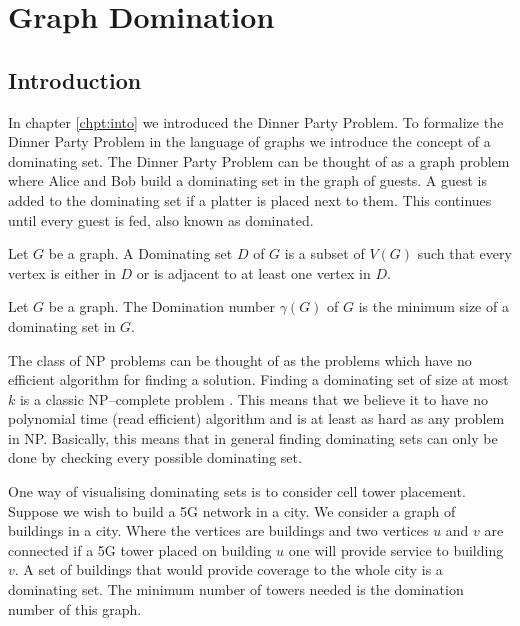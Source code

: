 \chapter{Graph Domination}\label{chpt:domSet}

\section{Introduction}

In chapter \ref{chpt:into} we introduced the Dinner Party Problem. To formalize the Dinner Party Problem in the language of graphs we introduce the concept of a dominating set. The Dinner Party Problem  can be thought of as  a graph problem where Alice and Bob build a dominating set in the graph of guests. A guest is added to the dominating set if a platter is placed next to them. This continues until every guest is fed, also known as dominated. 

\begin{definition}
    Let $G$ be a graph. A Dominating set $D$ of $G$ is a subset of $V(G)$ such that every vertex is either in $D$ or is adjacent to at least one vertex in $D$.
\end{definition} 
\begin{definition}
    Let $G$ be a graph. The Domination number $\gamma(G)$ of $G$ is the minimum size of a dominating set in $G$.
\end{definition}

The class of NP problems can be thought of as the problems which have no efficient algorithm for finding a solution. 
Finding a dominating set of size at most $k$ is a classic NP--complete problem \cite[p.~190]{garey1979computers}. This means that we believe it to have no polynomial time (read efficient) algorithm and is at least as hard as any problem in NP. Basically, this means that in general finding dominating sets can only be done by checking every possible dominating set.

One way of visualising dominating sets is to consider cell tower placement. Suppose we wish to build a 5G network in a city. We consider a graph of buildings in a city. Where the vertices are buildings and two vertices $u$ and $v$ are connected if a 5G tower placed on building $u$ one will provide service to building $v$. A set of buildings that would provide coverage to the whole city is a dominating set. The minimum number of towers needed is the domination number of this graph.

